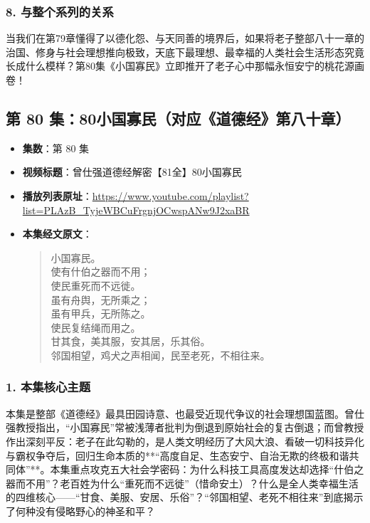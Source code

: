 \subsubsection{8. 与整个系列的关系}
当我们在第79章懂得了以德化怨、与天同善的境界后，如果将老子整部八十一章的治国、修身与社会理想推向极致，天底下最理想、最幸福的人类社会生活形态究竟长成什么模样？第80集《小国寡民》立即推开了老子心中那幅永恒安宁的桃花源画卷！

\clearpage

\subsection{第 80 集：80小国寡民（对应《道德经》第八十章）}
\label{sec:ep80}

\begin{itemize}
    \item \textbf{集数}：第 80 集
    \item \textbf{视频标题}：曾仕强道德经解密【81全】80小国寡民
    \item \textbf{播放列表原址}：\url{https://www.youtube.com/playlist?list=PLAzB_TyjeWBCuFrgnjOCwspANw9J2xaBR}
    \item \textbf{本集经文原文}：
    \begin{quote}\kaishu
    小国寡民。\\
    使有什伯之器而不用；\\
    使民重死而不远徙。\\
    虽有舟舆，无所乘之；\\
    虽有甲兵，无所陈之。\\
    使民复结绳而用之。\\
    甘其食，美其服，安其居，乐其俗。\\
    邻国相望，鸡犬之声相闻，民至老死，不相往来。
    \end{quote}
\end{itemize}

\subsubsection{1. 本集核心主题}
本集是整部《道德经》最具田园诗意、也最受近现代争议的社会理想国蓝图。曾仕强教授指出，“小国寡民”常被浅薄者批判为倒退到原始社会的复古倒退；而曾教授作出深刻平反：老子在此勾勒的，是人类文明经历了大风大浪、看破一切科技异化与霸权争夺后，回归生命本质的**“高度自足、生态安宁、自治无欺的终极和谐共同体”**。本集重点攻克五大社会学密码：为什么科技工具高度发达却选择“什伯之器而不用”？老百姓为什么“重死而不远徙”（惜命安土）？什么是全人类幸福生活的四维核心——“甘食、美服、安居、乐俗”？“邻国相望、老死不相往来”到底揭示了何种没有侵略野心的神圣和平？

